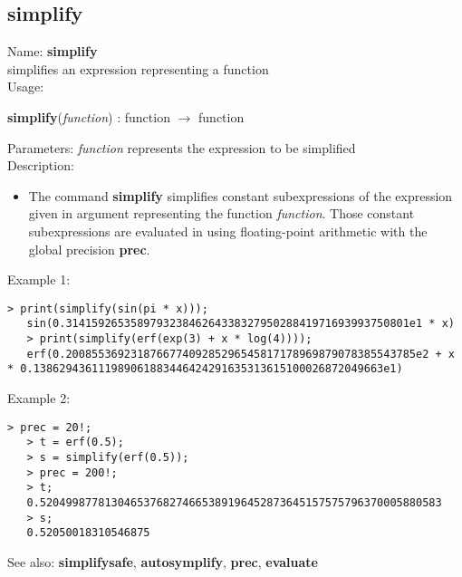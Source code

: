 \subsection{ simplify }
\noindent Name: \textbf{simplify}\\
simplifies an expression representing a function\\

\noindent Usage: 
\begin{center}
\textbf{simplify}(\emph{function}) : \textsf{function} $\rightarrow$ \textsf{function}\\
\end{center}
Parameters: 
\emph{function} represents the expression to be simplified\\

\noindent Description: \begin{itemize}

\item The command \textbf{simplify} simplifies constant subexpressions of the
   expression given in argument representing the function
   \emph{function}. Those constant subexpressions are evaluated in using
   floating-point arithmetic with the global precision \textbf{prec}.
\end{itemize}
\noindent Example 1: 
\begin{center}\begin{minipage}{14.8cm}\begin{Verbatim}[frame=single]
   > print(simplify(sin(pi * x)));
   sin(0.31415926535897932384626433832795028841971693993750801e1 * x)
   > print(simplify(erf(exp(3) + x * log(4))));
   erf(0.200855369231876677409285296545817178969879078385543785e2 + x * 0.138629436111989061883446424291635313615100026872049663e1)
\end{Verbatim}
\end{minipage}\end{center}
\noindent Example 2: 
\begin{center}\begin{minipage}{14.8cm}\begin{Verbatim}[frame=single]
   > prec = 20!;
   > t = erf(0.5);
   > s = simplify(erf(0.5));
   > prec = 200!;
   > t;
   0.52049987781304653768274665389196452873645157575796370005880583
   > s;
   0.52050018310546875
\end{Verbatim}
\end{minipage}\end{center}
See also: \textbf{simplifysafe}, \textbf{autosymplify}, \textbf{prec}, \textbf{evaluate}
